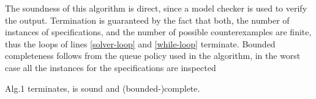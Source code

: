 The soundness of this algorithm is direct, since a model checker is used to verify the output. Termination is guaranteed by the fact that both,  the number of instances of specifications, and the number of possible counterexamples are finite, thus the loops of lines \ref{solver-loop} and \ref{while-loop} terminate. Bounded completeness follows from the queue policy used in the algorithm, in the worst case all the instances for the specifications are inspected

\begin{theorem}\label{theorem:cex-completeness} Alg.1 terminates, is sound and (bounded-)complete.
\end{theorem}
\fi

	
	
